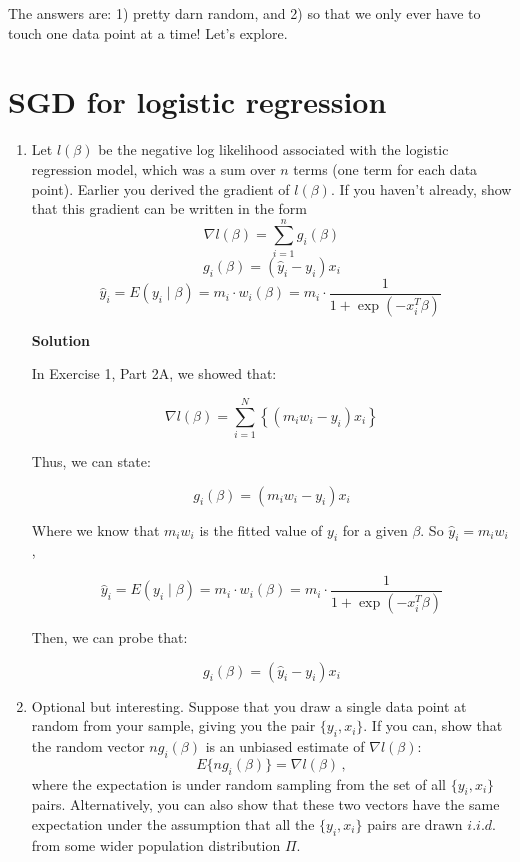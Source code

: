 \documentclass[11 pt]{article}
\begin{document}
The answers are: 1) pretty darn random, and 2) so that we only ever have to touch one data point at a time!  Let's explore.


\newpage

\section{SGD for logistic regression}

\begin{enumerate}[label=(\Alph*)]
	
	\item Let $l(\beta)$ be the negative log likelihood associated with the logistic regression model, which was a sum over $n$ terms (one term for each data point).  Earlier you derived the gradient of $l(\beta)$.  If you haven't already, show that this gradient can be written in the form
	$$ 	\nabla l(\beta) =  \sum_{i=1}^n g_i(\beta)  $$
	$$ g_i(\beta) = (\hat y_i - y_i) x_i $$
	$$ \hat{y}_i = E(y_i \mid \beta) = m_i \cdot w_i(\beta) = m_i \cdot \frac{1}{1 + \exp(-x_i^T \beta)} \, $$
	
	\vspace{2mm}
	\textbf{Solution}

In Exercise 1, Part 2A, we showed that:

 $$  \nabla l(\beta)  = \displaystyle\sum_{i=1}^{N}\left \{ (m_iw_i - y_i)x_i \right \}$$	
 
 Thus, we can state:
 
 $$ g_i(\beta) =  (m_iw_i - y_i)x_i  $$
 
 Where we know that $m_iw_i$ is the fitted value of $y_i$ for a given $\beta$. So  $\hat y_i = m_iw_i$, 
 
 $$	\hat{y}_i = E(y_i \mid \beta) = m_i \cdot w_i(\beta) = m_i \cdot \frac{1}{1 + \exp(-x_i^T \beta)} $$
 
 Then, we can probe that:
 
  $$ g_i(\beta) =  (\hat y_i - y_i)x_i  $$
 
 
	
	
	
	\newpage
	
	\item Optional but interesting.  Suppose that you draw a single data point at random from your sample, giving you the pair $\{y_i, x_i\}$.  If you can, show that the random vector $n g_i(\beta)$ is an unbiased estimate of $\nabla l(\beta)$:
	$$
	E \{ n g_i(\beta) \} = \nabla l(\beta) \, ,
	$$
	where the expectation is under random sampling from the set of all $\{y_i, x_i\}$ pairs.  Alternatively, you can also show that these two vectors have the same expectation under the assumption that all the $\{y_i, x_i\}$ pairs are drawn $i.i.d.$ from some wider population distribution $\Pi$.
	

\end{enumerate}
\end{document}
